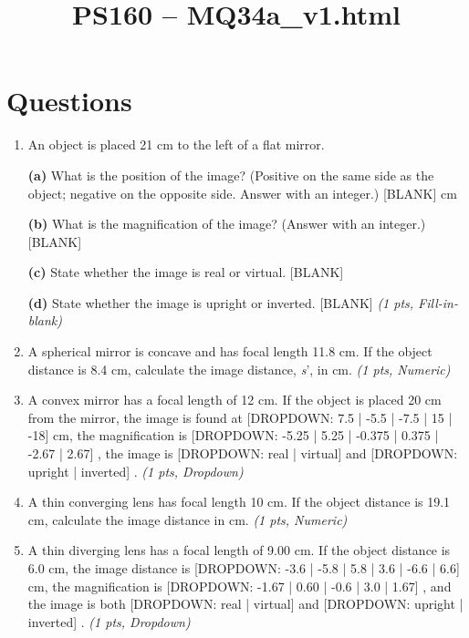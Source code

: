 \documentclass[11pt]{article}
\title{PS160 -- MQ34a\_v1.html}
\date{}
\begin{document}
\maketitle

\section*{Questions}

\begin{enumerate}[leftmargin=*]
  \item An object is placed 21 cm to the left of a flat mirror.

\textbf{(a)} What is the position of the image? (Positive on the same side as the object; negative on the opposite side. Answer with an integer.) [BLANK]
cm

\textbf{(b)} What is the magnification of the image? (Answer with an integer.) [BLANK]

\textbf{(c)} State whether the image is real or virtual. [BLANK]

\textbf{(d)} State whether the image is upright or inverted. [BLANK] \hfill \textit{(1 pts, Fill-in-blank)}

  \item A spherical mirror is concave and has focal length 11.8 cm. If the object distance is 8.4 cm, calculate the image distance, \emph{s}', in cm. \hfill \textit{(1 pts, Numeric)}

  \item A convex mirror has a focal length of 12 cm. If the object is placed 20 cm from the mirror, the image is found at [DROPDOWN: 7.5 | -5.5 | -7.5 | 15 | -18]
cm, the magnification is [DROPDOWN: -5.25 | 5.25 | -0.375 | 0.375 | -2.67 | 2.67]
, the image is [DROPDOWN: real | virtual]
and [DROPDOWN: upright | inverted]
. \hfill \textit{(1 pts, Dropdown)}

  \item A thin converging lens has focal length 10 cm. If the object distance is 19.1 cm, calculate the image distance in cm. \hfill \textit{(1 pts, Numeric)}

  \item A thin diverging lens has a focal length of 9.00 cm. If the object distance is 6.0 cm, the image distance is [DROPDOWN: -3.6 | -5.8 | 5.8 | 3.6 | -6.6 | 6.6]
cm, the magnification is [DROPDOWN: -1.67 | 0.60 | -0.6 | 3.0 | 1.67]
, and the image is both [DROPDOWN: real | virtual]
and [DROPDOWN: upright | inverted]
. \hfill \textit{(1 pts, Dropdown)}

\end{enumerate}
\end{document}
